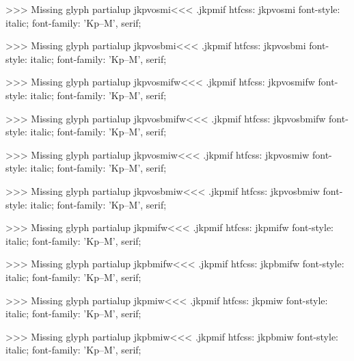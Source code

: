 >>>
Missing glyph	partialup
\<jkpvosmi\><<<
.jkpmif
htfcss:  jkpvosmi  font-style: italic; font-family: 'Kp--M', serif;

>>>
Missing glyph	partialup
\<jkpvosbmi\><<<
.jkpmif
htfcss:  jkpvosbmi  font-style: italic; font-family: 'Kp--M', serif;

>>>
Missing glyph	partialup
\<jkpvosmifw\><<<
.jkpmif
htfcss:  jkpvosmifw  font-style: italic; font-family: 'Kp--M', serif;

>>>
Missing glyph	partialup
\<jkpvosbmifw\><<<
.jkpmif
htfcss:  jkpvosbmifw  font-style: italic; font-family: 'Kp--M', serif;

>>>
Missing glyph	partialup
\<jkpvosmiw\><<<
.jkpmif
htfcss:  jkpvosmiw  font-style: italic; font-family: 'Kp--M', serif;

>>>
Missing glyph	partialup
\<jkpvosbmiw\><<<
.jkpmif
htfcss:  jkpvosbmiw  font-style: italic; font-family: 'Kp--M', serif;

>>>
Missing glyph	partialup
\<jkpmifw\><<<
.jkpmif
htfcss:  jkpmifw  font-style: italic; font-family: 'Kp--M', serif;

>>>
Missing glyph	partialup
\<jkpbmifw\><<<
.jkpmif
htfcss:  jkpbmifw  font-style: italic; font-family: 'Kp--M', serif;

>>>
Missing glyph	partialup
\<jkpmiw\><<<
.jkpmif
htfcss:  jkpmiw  font-style: italic; font-family: 'Kp--M', serif;

>>>
Missing glyph	partialup
\<jkpbmiw\><<<
.jkpmif
htfcss:  jkpbmiw  font-style: italic; font-family: 'Kp--M', serif;

